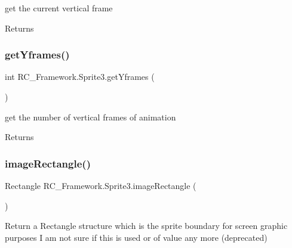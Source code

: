 get the current vertical frame 

\begin{DoxyReturn}{Returns}

\end{DoxyReturn}
\mbox{\label{class_r_c___framework_1_1_sprite3_ac03a161791879ccf0758985c9dc49cce}} 
\subsubsection{\texorpdfstring{get\+Yframes()}{getYframes()}}
{\footnotesize\ttfamily int R\+C\+\_\+\+Framework.\+Sprite3.\+get\+Yframes (\begin{DoxyParamCaption}{ }\end{DoxyParamCaption})}



get the number of vertical frames of animation 

\begin{DoxyReturn}{Returns}

\end{DoxyReturn}
\mbox{\label{class_r_c___framework_1_1_sprite3_a438ffa0b834a51a9f9cf35e372457d41}} 
\subsubsection{\texorpdfstring{image\+Rectangle()}{imageRectangle()}}
{\footnotesize\ttfamily Rectangle R\+C\+\_\+\+Framework.\+Sprite3.\+image\+Rectangle (\begin{DoxyParamCaption}{ }\end{DoxyParamCaption})}



Return a Rectangle structure which is the sprite boundary for screen graphic purposes I am not sure if this is used or of value any more (deprecated) 

\mbox{\label{class_r_c___framework_1_1_sprite3_addc1a2eb2b33095855d15652afac06e9}} 
